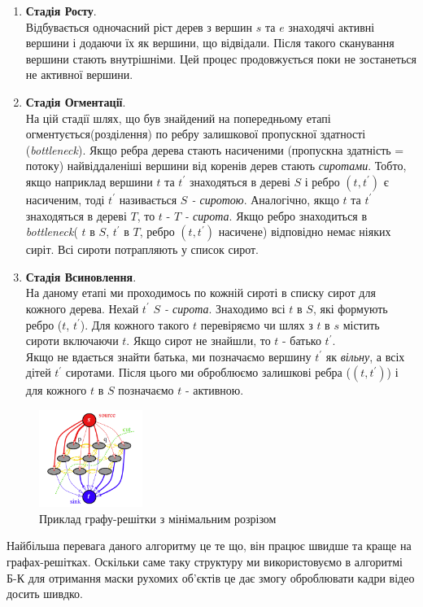 \begin{enumerate}
    \item \textbf{Стадія Росту}. \\
        Відбувається одночасний ріст дерев з вершин $s$ та $e$ знаходячі активні
        вершини і додаючи їх як вершини, що відвідали. Після такого сканування вершини 
        стають внутрішніми. Цей процес продовжується поки не зостанеться не активної вершини.
    \item \textbf{Стадія Огментації}. \\
        На цій стадії шлях, що був знайдений на попередньому етапі огментується(розділення)
        по ребру залишкової пропускної здатності (\textit{bottleneck}). Якщо ребра дерева стають 
        насиченими (пропускна здатність = потоку) найвіддаленіші вершини від коренів дерев стають
        \textit{сиротами}. Тобто, якщо наприклад вершини $t$ та $t^{'}$ знаходяться в дереві $S$
        і ребро $(t,t^{'})$ є насиченим, тоді $t^{'}$ називається \textit{$S$ - сиротою}.
        Аналогічно, якщо $t$ та $t^{'}$ знаходяться в дереві $T$, то  $t$ - \textit{$T$ - сирота}.
        Якщо ребро знаходиться в \textit{bottleneck}( $t$ в $S$, $t^{'}$ в $T$, ребро $(t,t^{'})$ 
        насичене) відповідно немає ніяких сиріт. Всі сироти потрапляють у список сирот. 
    \item \textbf{Стадія Всиновлення}. \\
        На даному етапі ми проходимось по кожній сироті в списку сирот для кожного дерева.
        Нехай $t^{'}$ \textit{$S$ - сирота}. Знаходимо всі $t$  в $S$, які формують ребро 
        ($t$, $t^{'}$). Для кожного такого $t$ перевіряємо чи шлях з $t$ в $s$ містить сироти
        включаючи $t$. Якщо сирот не знайшли, то $t$ - батько  $t^{'}$. \\
        Якщо не вдається знайти батька, ми позначаємо вершину $t^{'}$ як \textit{вільну}, а всіх
        дітей $t^{'}$ сиротами. Після цього ми оброблюємо залишкові ребра ($(t,t^{'})$) і для кожного $t$ в $S$ позначаємо
        $t$ - активною. 
\end{enumerate}


\begin{figure}[h]
    \centering
    \includegraphics[width=0.3\textwidth]{images/graph_cut}
    \caption{Приклад графу-решітки з мінімальним розрізом}
    \label{fig:graph_example}
\end{figure}

Найбільша перевага даного алгоритму це те що, він працює швидше та краще на графах-решітках.
Оскільки саме таку структуру ми використовуємо в алгоритмі Б-К для отримання маски рухомих 
об'єктів це дає змогу оброблювати кадри відео досить шивдко.
